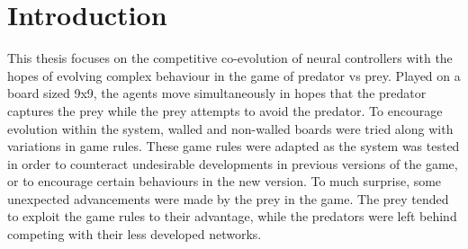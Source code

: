 \section{Introduction}

This thesis focuses on the competitive co-evolution of neural controllers with the hopes of evolving complex behaviour in the game of predator vs prey. Played on a board sized 9x9, the agents move simultaneously in hopes that the predator captures the prey while the prey attempts to avoid the predator. To encourage evolution within the system, walled and non-walled boards were tried along with variations in game rules. These game rules were adapted as the system was tested in order to counteract undesirable developments in previous versions of the game, or to encourage certain behaviours in the new version. To much surprise, some unexpected advancements were made by the prey in the game. The prey tended to exploit the game rules to their advantage, while the predators were left behind competing with their less developed networks. 